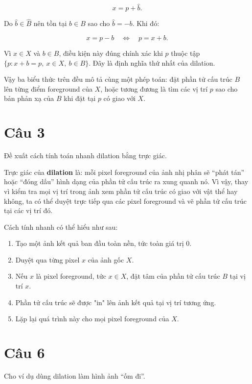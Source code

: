 \begin{equation}
    x = p + \hat{b}.
\end{equation}

Do $\hat{b}\in\hat{B}$ nên tồn tại $b\in B$ sao cho $\hat{b}=-b$. Khi đó:

\begin{equation}
    x = p - b \quad \Leftrightarrow \quad p = x + b.
\end{equation}

Vì $x\in X$ và $b\in B$, điều kiện này đúng chính xác khi $p$ thuộc tập $\{p:x+b=p,\ x\in X,\ b\in B\}$. Đây là định nghĩa thứ nhất của dilation.

Vậy ba biểu thức trên đều mô tả cùng một phép toán: đặt phần tử cấu trúc $B$ lên từng điểm foreground của $X$, hoặc tương đương là tìm các vị trí $p$ sao cho bản phản xạ của $B$ khi đặt tại $p$ có giao với $X$.

\section*{Câu 3}
Đề xuất cách tính toán nhanh dilation bằng trực giác.

Trực giác của \textbf{dilation} là: mỗi pixel foreground của ảnh nhị phân sẽ ``phát tán'' hoặc ``đóng dấu'' hình dạng của phần tử cấu trúc ra xung quanh nó. Vì vậy, thay vì kiểm tra mọi vị trí trong ảnh xem phần tử cấu trúc có giao với vật thể hay không, ta có thể duyệt trực tiếp qua các pixel foreground và vẽ phần tử cấu trúc tại các vị trí đó.

Cách tính nhanh có thể hiểu như sau:

\begin{enumerate}
    \item Tạo một ảnh kết quả ban đầu toàn nền, tức toàn giá trị $0$.

    \item Duyệt qua từng pixel $x$ của ảnh gốc $X$.

    \item Nếu $x$ là pixel foreground, tức $x\in X$, đặt tâm của phần tử cấu trúc $B$ tại vị trí $x$.

    \item Phần tử cấu trúc sẽ được "in" lên ảnh kết quả tại vị trí tương ứng.

    \item Lặp lại quá trình này cho mọi pixel foreground của $X$.
\end{enumerate}

\section*{Câu 6}
Cho ví dụ dùng dilation làm hình ảnh ``ốm đi''.


